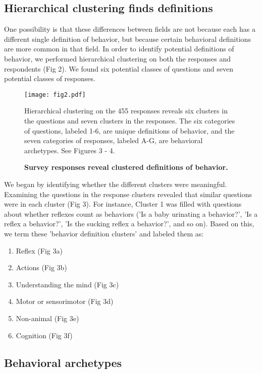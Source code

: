 \documentclass[a4paper, 11pt]{article}
\begin{document}
\subsection*{Hierarchical clustering finds definitions}

One possibility is that these differences between fields are not because each has a different single definition of behavior, but because certain behavioral definitions are more common in that field. In order to identify potential definitions of behavior, we performed hierarchical clustering on both the responses and respondents (Fig 2). We found six potential classes of questions and seven potential classes of responses. 

\begin{figure}
\centerline{\texttt{[image: fig2.pdf]}}
\caption{\textbf{Survey responses reveal clustered definitions of behavior.}} Hierarchical clustering on the 455 responses reveals six clusters in the questions and seven clusters in the responses. The six categories of questions, labeled 1-6, are unique definitions of behavior, and the seven categories of responses, labeled A-G, are behavioral archetypes. See Figures 3 - 4.
\end{figure}

We began by identifying whether the different clusters were meaningful. Examining the questions in the response clusters revealed that similar questions were in each cluster (Fig 3). For instance, Cluster 1 was filled with questions about whether reflexes count as behaviors ('Is a baby urinating a behavior?', 'Is a reflex a behavior?', 'Is the sucking reflex a behavior?', and so on). Based on this, we term these 'behavior definition clusters' and labeled them as:

\begin{enumerate}
 \item Reflex (Fig 3a)
 \item Actions (Fig 3b)
 \item Understanding the mind  (Fig 3c)
 \item Motor or sensorimotor  (Fig 3d)
 \item Non-animal  (Fig 3e)
 \item Cognition  (Fig 3f)
\end{enumerate}

\subsection*{Behavioral archetypes}
\end{document}
